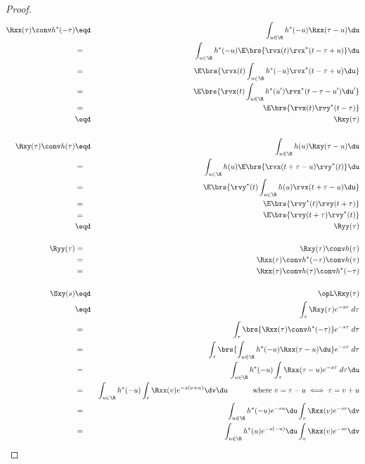 \begin{proof}
\begin{eqnarray*}
   \Rxx(\tau) \conv h^\ast(-\tau)
     &\eqd& \int_{u\in\R}h^\ast(-u) \Rxx(\tau-u)\du
   \\&=&    \int_{u\in\R}h^\ast(-u) \E\brs{\rvx(t) \rvx^\ast(t-\tau+u) } \du
   \\&=&    \E\brs{\rvx(t) \int_{u\in\R}h^\ast(-u)  \rvx^\ast(t-\tau+u) \du   }
   \\&=&    \E\brs{\rvx(t) \int_{u\in\R}h^\ast(u^\prime)  \rvx^\ast(t-\tau-u^\prime) \du^\prime   }
   \\&=&    \E\brs{\rvx(t) \rvy^\ast(t-\tau)  }
   \\&\eqd& \Rxy(\tau)
\\
\\
   \Rxy(\tau) \conv h(\tau)
     &\eqd& \int_{u\in\R}h(u) \Rxy(\tau-u)\du
   \\&=&    \int_{u\in\R}h(u) \E\brs{\rvx(t+\tau-u) \rvy^\ast(t) } \du
   \\&=&    \E\brs{\rvy^\ast(t) \int_{u\in\R}h(u) \rvx(t+\tau-u)  \du }
   \\&=&    \E\brs{\rvy^\ast(t) \rvy(t+\tau) }
   \\&=&    \E\brs{ \rvy(t+\tau) \rvy^\ast(t)}
   \\&\eqd& \Ryy(\tau)
\\
\\
   \Ryy(\tau)
     &=& \Rxy(\tau) \conv h(\tau)
   \\&=& \Rxx(\tau) \conv h^\ast(-\tau) \conv h(\tau)
   \\&=& \Rxx(\tau) \conv h(\tau)  \conv h^\ast(-\tau)
\\
\\
  \Sxy(s)
     &\eqd& \opL \Rxy(\tau)
   \\&\eqd& \int_\tau \Rxy(\tau) e^{-s\tau} \; d\tau
   \\&=&    \int_\tau \brs{ \Rxx(\tau) \conv h^\ast(-\tau) } e^{-s\tau} \; d\tau
   \\&=&    \int_\tau \brs{ \int_{u\in\R}h^\ast(-u) \Rxx(\tau-u)\du } e^{-s\tau} \; d\tau
   \\&=&    \int_{u\in\R}h^\ast(-u) \int_\tau \Rxx(\tau-u)e^{-s\tau} \; d\tau\du
   \\&=&    \int_{u\in\R}h^\ast(-u) \int_v \Rxx(v)e^{-s(v+u)} \dv \du
            \hspace{3em}\mbox{ where $v=\tau-u\iff \tau=v+u$}
   \\&=&    \int_{u\in\R}h^\ast(-u) e^{-su} \du \int_v \Rxx(v)e^{-sv} \dv
   \\&=&    \int_{u\in\R}h^\ast(u) e^{-s(-u)} \du \int_v \Rxx(v)e^{-sv} \dv

\end{eqnarray*}
\end{proof}
